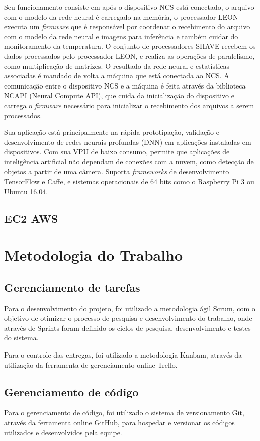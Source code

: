 \documentclass[]{politex}
\begin{document}
Seu funcionamento consiste em após o dispositivo NCS está conectado, o arquivo com o modelo da rede neural é carregado na memória, o processador LEON executa um \textit{firmware} que é responsável por coordenar o recebimento do arquivo com o modelo da rede neural e imagens para inferência e também cuidar do monitoramento da temperatura. O conjunto de processadores SHAVE recebem os dados processados pelo processador LEON, e realiza as operações de paralelismo, como multiplicação de matrizes. O resultado da rede neural e estatísticas associadas é mandado de volta a máquina que está conectada ao NCS. A comunicação entre o dispositivo NCS e a máquina é feita através da biblioteca NCAPI (Neural Compute API), que cuida da inicialização do dispositivo e carrega o \textit{firmware} necessário para inicializar o recebimento dos arquivos a serem processados.  

Sua aplicação está principalmente na rápida prototipação, validação e desenvolvimento de redes neurais profundas (DNN) em aplicações instaladas em dispositivos. Com sua VPU de baixo consumo, permite que aplicações de inteligência artificial não dependam de conexões com a nuvem, como detecção de objetos a partir de uma câmera. Suporta \textit{frameworks} de desenvolvimento TensorFlow e Caffe, e sistemas operacionais de 64 bits como o Raspberry Pi 3 ou Ubuntu 16.04.


\section{EC2 AWS}

\chapter{Metodologia do Trabalho}

\section{Gerenciamento de tarefas}
Para o desenvolvimento do projeto, foi utilizado a metodologia ágil Scrum, com o objetivo de otimizar o processo de pesquisa e desenvolvimento do trabalho, onde através de Sprints foram definido os ciclos de pesquisa, desenvolvimento e testes do sistema.

Para o controle das entregas, foi utilizado a metodologia Kanbam, através da utilização da ferramenta de gerenciamento online Trello.

\section{Gerenciamento de código}
Para o gerenciamento de código, foi utilizado o sistema de versionamento Git, através da ferramenta online GitHub, para hospedar e versionar os códigos utilizados e desenvolvidos pela equipe.
\end{document}
